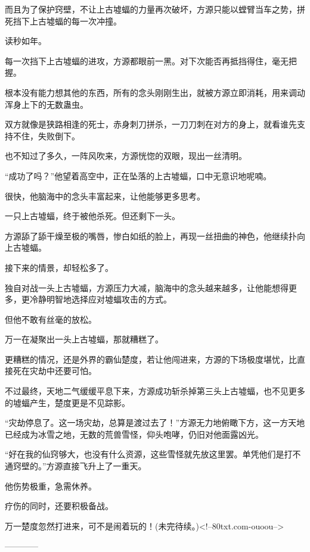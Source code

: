 \begin{this_body}
而且为了保护窍壁，不让上古墟蝠的力量再次破坏，方源只能以螳臂当车之势，拼死挡下上古墟蝠的每一次冲撞。

读秒如年。

每一次挡下上古墟蝠的进攻，方源都眼前一黑。对下次能否再抵挡得住，毫无把握。

根本没有能力想其他的东西，所有的念头刚刚生出，就被方源立即消耗，用来调动浑身上下的无数蛊虫。

双方就像是狭路相逢的死士，赤身刺刀拼杀，一刀刀刺在对方的身上，就看谁先支持不住，失败倒下。

也不知过了多久，一阵风吹来，方源恍惚的双眼，现出一丝清明。

“成功了吗？”他望着高空中，正在坠落的上古墟蝠，口中无意识地呢喃。

很快，他脑海中的念头丰富起来，让他能够更多思考。

一只上古墟蝠，终于被他杀死。但还剩下一头。

方源舔了舔干燥至极的嘴唇，惨白如纸的脸上，再现一丝扭曲的神色，他继续扑向上古墟蝠。

接下来的情景，却轻松多了。

独自对战一头上古墟蝠，方源压力大减，脑海中的念头越来越多，让他能想得更多，更冷静明智地选择应对墟蝠攻击的方式。

但他不敢有丝毫的放松。

万一在凝聚出一头上古墟蝠，那就糟糕了。

更糟糕的情况，还是外界的霸仙楚度，若让他闯进来，方源的下场极度堪忧，比直接死在灾劫中还要可怕。

不过最终，天地二气缓缓平息下来，方源成功斩杀掉第三头上古墟蝠，也不见更多的墟蝠产生，楚度更是不见踪影。

“灾劫停息了。这一场灾劫，总算是渡过去了！”方源无力地俯瞰下方，这一方天地已经成为冰雪之地，无数的荒兽雪怪，仰头咆哮，仍旧对他面露凶光。

“好在我的仙窍够大，也没有什么资源，这些雪怪就先放这里罢。单凭他们是打不通窍壁的。”方源直接飞升上了一重天。

他伤势极重，急需休养。

疗伤的同时，还要积极备战。

万一楚度忽然打进来，可不是闹着玩的！(未完待续。)<!--80txt.com-ouoou-->

------------

\end{this_body}

